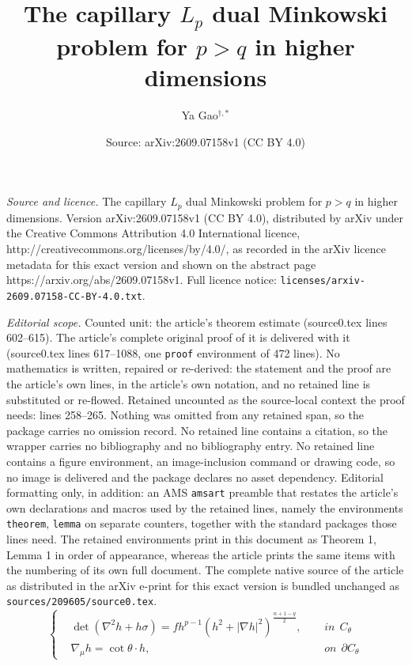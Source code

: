 \documentclass[10pt,a4paper]{amsart}
\title{The capillary $L_p$ dual Minkowski problem for $p>q$ in higher dimensions}
\author{Ya Gao$^{\dagger,\ast}$}
\date{Source: arXiv:2609.07158v1 (CC BY 4.0)}
\begin{document}
\maketitle

\noindent\emph{Source and licence.} The capillary $L_p$ dual Minkowski problem for $p>q$ in higher dimensions. Version arXiv:2609.07158v1 (CC BY 4.0), distributed by arXiv under the Creative Commons Attribution 4.0 International licence, http://creativecommons.org/licenses/by/4.0/, as recorded in the arXiv licence metadata for this exact version and shown on the abstract page https://arxiv.org/abs/2609.07158v1. Full licence notice: \texttt{licenses/arxiv-2609.07158-CC-BY-4.0.txt}.\par\smallskip

\noindent\textit{Editorial scope.} Counted unit: the article's theorem estimate (source0.tex lines 602--615). The article's complete original proof of it is delivered with it (source0.tex lines 617--1088, one \texttt{proof} environment of 472 lines). No mathematics is written, repaired or re-derived: the statement and the proof are the article's own lines, in the article's own notation, and no retained line is substituted or re-flowed.  Retained uncounted as the source-local context the proof needs: lines 258--265.  Nothing was omitted from any retained span, so the package carries no omission record.  No retained line contains a citation, so the wrapper carries no bibliography and no bibliography entry.  No retained line contains a figure environment, an image-inclusion command or drawing code, so no image is delivered and the package declares no asset dependency.  Editorial formatting only, in addition: an AMS \texttt{amsart} preamble that restates the article's own declarations and macros used by the retained lines, namely the environments \texttt{theorem}, \texttt{lemma} on separate counters, together with the standard packages those lines need.  The retained environments print in this document as Theorem 1, Lemma 1 in order of appearance, whereas the article prints the same items with the numbering of its own full document.  The complete native source of the article as distributed in the arXiv e-print for this exact version is bundled unchanged as \texttt{sources/209605/source0.tex}.
\begin{equation}\label{Eq}
\left\{
\begin{aligned}
&\det\left(\nabla^2 h + h\sigma\right)=fh^{p-1}\left(h^2 + |\nabla h|^2\right)^{\frac{n+1-q}{2}}, ~~&&in~~C_{\theta}\\
&\nabla_{\mu} h=\cot\theta\cdot h,  ~~&& on~~\partial C_{\theta}
\end{aligned}
\right.
\end{equation}
\end{document}
